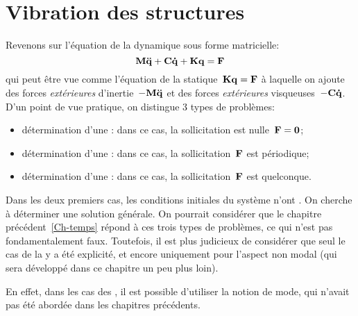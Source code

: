 \section{Vibration des structures}
Revenons sur l'équation de la dynamique sous forme matricielle:
\begin{equation} \MM{M}\VV{\ddot{q}}+\MM{C}\VV{\dot{q}}+\MM{K}\VV{q}=\VV{F} \end{equation}
qui peut être vue comme l'équation de la statique~$\MM{K}\VV{q}=\VV{F}$ à laquelle on
ajoute des forces \emph{extérieures} d'inertie~$-\MM{M}\VV{\ddot{q}}$ et des forces \emph{extérieures} visqueuses~$-\MM{C}\VV{\dot{q}}$.
\medskipvm
D'un point de vue pratique, on distingue 3 types de problèmes:
\begin{itemize}
  \item détermination d'une :
	dans ce cas, la sollicitation est nulle~$\VV{F} = \VV{0}$;
  \item détermination d'une :
 	dans ce cas, la sollicitation~$\VV{F}$ est périodique;
  \item détermination d'une :
	dans ce cas, la sollicitation~$\VV{F}$ est quelconque.
\end{itemize}
Dans les deux premiers cas, les conditions initiales du système n'ont .
On cherche à déterminer une solution générale.
\medskipvm
On pourrait considérer que le chapitre précédent~\ref{Ch-temps} répond à ces trois
types de problèmes, ce qui n'est pas fondamentalement faux.
Toutefois, il est plus judicieux de considérer que seul le cas de la 
y a été explicité, et encore uniquement pour l'aspect non modal (qui sera développé dans ce chapitre
un peu plus loin).

En effet, dans les cas des ,
il est possible d'utiliser la notion de mode, qui n'avait pas été abordée dans les chapitres précédents.


\medskip
